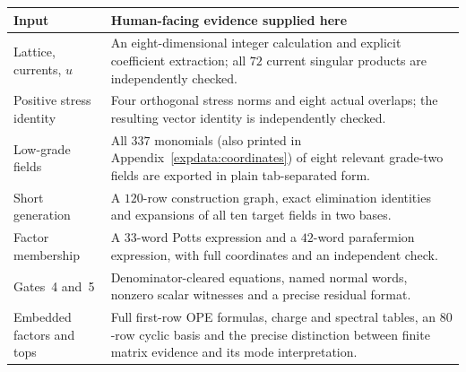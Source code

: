 \begin{center}\small
\begin{tabular}{@{}P{.25\linewidth}P{.65\linewidth}@{}}
\toprule Input & Human-facing evidence supplied here\\\midrule
Lattice, currents, $u$ & An eight-dimensional integer calculation and
explicit coefficient extraction; all $72$ current singular products
are independently checked.\\
Positive stress identity & Four orthogonal stress norms and eight actual
overlaps; the resulting vector identity is independently checked.\\
Low-grade fields & All $337$ monomials (also printed in Appendix~\ref{expdata:coordinates}) of eight relevant grade-two fields
are exported in plain tab-separated form.\\
Short generation & A $120$-row construction graph, exact elimination
identities and expansions of all ten target fields in two bases.\\
Factor membership & A $33$-word Potts expression and a $42$-word
parafermion expression, with full coordinates and an independent check.\\
Gates~4 and~5 & Denominator-cleared equations, named normal words,
nonzero scalar witnesses and a precise residual format.\\
Embedded factors and tops & Full first-row OPE formulas, charge and
spectral tables, an $80$-row cyclic basis and the precise distinction
between finite matrix evidence and its mode interpretation.\\
\bottomrule
\end{tabular}\end{center}

